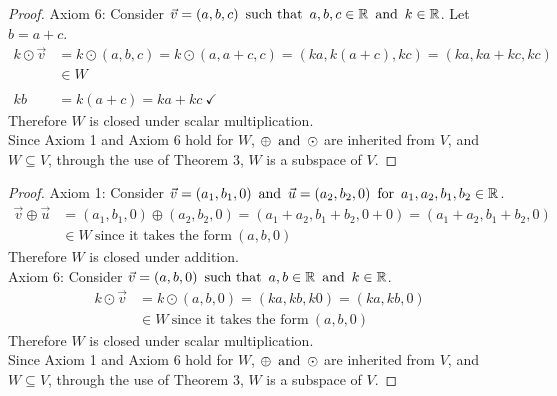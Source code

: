 \begin{enumerate}
\begin{proof}
    Axiom 6: Consider $\vec{v} = (a,b,c) \operatorname{~\text{such that}~} a,b,c \in \mathbb{R} \operatorname{~\text{and}~} k \in \mathbb{R}$. Let $b = a+c$.
    \begin{align*}
      k \odot \vec{v} & = k \odot (a,b,c) = k \odot (a,a+c,c) = (ka, k(a+c), kc) = (ka, ka+kc, kc) \\
                      & \in W                                                                      \\ \\
      kb              & = k(a+c) = ka + kc~\checkmark
    \end{align*}
    Therefore $W$ is closed under scalar multiplication. \\
    Since Axiom 1 and Axiom 6 hold for $W$, $\oplus \operatorname{~\text{and}~} \odot$ are inherited from $V$, and $W \subseteq V$, through the use of Theorem 3, $W$ is a subspace of $V$.
  \end{proof}
  \begin{proof}
    Axiom 1: Consider $\vec{v} = (a_1,b_1,0) \operatorname{~\text{and}~} \vec{u} = (a_2,b_2,0) \operatorname{~\text{for}~} a_1,a_2,b_1,b_2 \in \mathbb{R}$.
    \begin{align*}
      \vec{v} \oplus \vec{u} & = (a_1,b_1,0) \oplus (a_2,b_2,0) = (a_1+a_2,b_1+b_2,0+0) = (a_1+a_2,b_1+b_2,0) \\
                             & \in W~\text{since it takes the form}~(a,b,0)
    \end{align*}
    Therefore $W$ is closed under addition. \\
    Axiom 6: Consider $\vec{v} = (a,b,0) \operatorname{~\text{such that}~} a,b \in \mathbb{R} \operatorname{~\text{and}~} k \in \mathbb{R}$.
    \begin{align*}
      k \odot \vec{v} & = k \odot (a,b,0) = (ka,kb,k0) = (ka,kb,0)   \\
                      & \in W~\text{since it takes the form}~(a,b,0)
    \end{align*}
    Therefore $W$ is closed under scalar multiplication. \\
    Since Axiom 1 and Axiom 6 hold for $W$, $\oplus \operatorname{~\text{and}~} \odot$ are inherited from $V$, and $W \subseteq V$, through the use of Theorem 3, $W$ is a subspace of $V$.
  \end{proof}
\end{enumerate}

